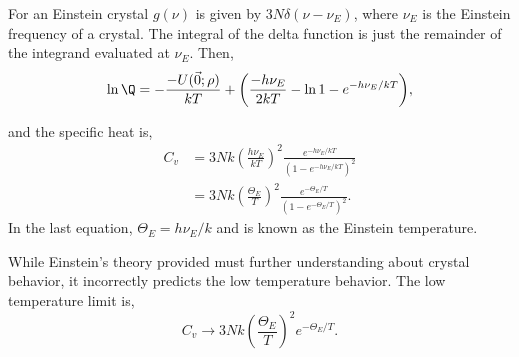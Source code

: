 For an Einstein crystal $g(\nu)$ is given by $3N \delta(\nu - \nu_{E})$, where
$\nu_E$ is the Einstein frequency of a crystal. The integral of the delta
function is just the remainder of the integrand evaluated at $\nu_E$. Then, 
 \begin{equation*}
	 \ln{\Q} = - \frac{-U(\vec{0}; \rho)}{kT} + {\left(\frac{-h\nu_E}{2kT} -
			 \ln{1 - e^{-h\nu_E/kT}}\right)},
\end{equation*}

and the specific heat is,
\begin{align*}
	C_v &= 3Nk {\left(\frac{h\nu_{E}}{kT}\right)}^2 \frac{e^{-h\nu_{E}/kT}}{(1 -
	e^{-h\nu_E/kT})^2} \\
		&= 3Nk {\left(\frac{\Theta_E}{T}\right)}^2 \frac{e^{-\Theta_E /T}}{(1 -
		e^{-\Theta_E /T})^2}.
\end{align*}
In the last equation, $\Theta_E = h\nu_E / k$ and is known as the Einstein
temperature.

While Einstein's theory provided must further understanding about crystal
behavior, it incorrectly predicts the low temperature behavior. The low
temperature limit is,
\begin{equation*}
	C_v \to 3Nk {\left(\frac{\Theta_{E}}{T}\right)}^2 e^{-\Theta_E /T}.
\end{equation*}

